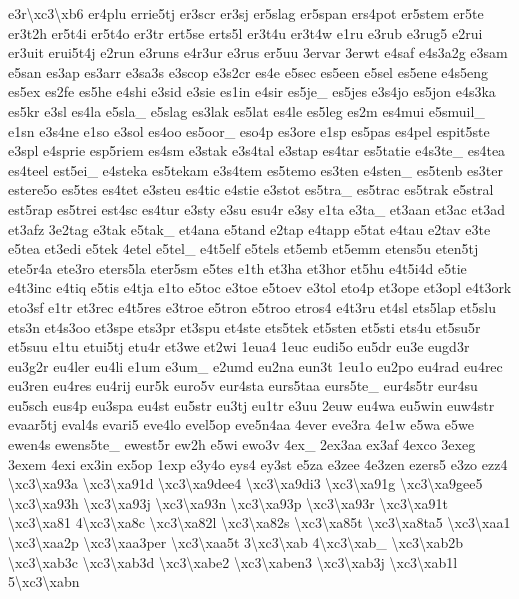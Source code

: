 {e3r\textbackslash{}xc3\textbackslash{}xb6 er4plu errie5tj er3scr er3sj er5slag er5span ers4pot er5stem er5te er3t2h er5t4i er5t4o er3tr ert5se erts5l er3t4u er3t4w e1ru e3rub e3rug5 e2rui er3uit erui5t4j e2run e3runs e4r3ur e3rus er5uu 3ervar 3erwt e4saf e4s3a2g e3sam e5san es3ap es3arr e3sa3s e3scop e3s2cr es4e e5sec es5een e5sel es5ene e4s5eng es5ex es2fe es5he e4shi e3sid e3sie es1in e4sir es5je\-\_\- es5jes e3s4jo es5jon e4s3ka es5kr e3sl es4la e5sla\-\_\- e5slag es3lak es5lat es4le es5leg es2m es4mui e5smuil\-\_\- e1sn e3s4ne e1so e3sol es4oo es5oor\-\_\- eso4p es3ore e1sp es5pas es4pel espit5ste e3spl e4sprie esp5riem es4sm e3stak e3s4tal e3stap es4tar es5tatie e4s3te\-\_\- es4tea es4teel est5ei\-\_\- e4steka es5tekam e3s4tem es5temo es3ten e4sten\-\_\- es5tenb es3ter estere5o es5tes es4tet e3steu es4tic e4stie e3stot es5tra\-\_\- es5trac es5trak e5stral est5rap es5trei est4sc es4tur e3sty e3su esu4r e3sy e1ta e3ta\-\_\- et3aan et3ac et3ad et3afz 3e2tag e3tak e5tak\-\_\- et4ana e5tand e2tap e4tapp e5tat e4tau e2tav e3te e5tea et3edi e5tek 4etel e5tel\-\_\- e4t5elf e5tels et5emb et5emm etens5u eten5tj ete5r4a ete3ro eters5la eter5sm e5tes e1th et3ha et3hor et5hu e4t5i4d e5tie e4t3inc e4tiq e5tis e4tja e1to e5toc e3toe e5toev e3tol eto4p et3ope et3opl e4t3ork eto3sf e1tr et3rec e4t5res e3troe e5tron e5troo etros4 e4t3ru et4sl ets5lap et5slu ets3n et4s3oo et3spe ets3pr et3spu et4ste ets5tek et5sten et5sti ets4u et5su5r et5suu e1tu etui5tj etu4r et3we et2wi 1eua4 1euc eudi5o eu5dr eu3e eugd3r eu3g2r eu4ler eu4li e1um e3um\-\_\- e2umd eu2na eun3t 1eu1o eu2po eu4rad eu4rec eu3ren eu4res eu4rij eur5k euro5v eur4sta eurs5taa eurs5te\-\_\- eur4s5tr eur4su eu5sch eus4p eu3spa eu4st eu5str eu3tj eu1tr e3uu 2euw eu4wa eu5win euw4str evaar5tj eval4s evari5 eve4lo evel5op eve5n4aa 4ever eve3ra 4e1w e5wa e5we ewen4s ewens5te\-\_\- ewest5r ew2h e5wi ewo3v 4ex\-\_\- 2ex3aa ex3af 4exco 3exeg 3exem 4exi ex3in ex5op 1exp e3y4o eys4 ey3st e5za e3zee 4e3zen ezers5 e3zo ezz4 \textbackslash{}xc3\textbackslash{}xa93a \textbackslash{}xc3\textbackslash{}xa91d \textbackslash{}xc3\textbackslash{}xa9dee4 \textbackslash{}xc3\textbackslash{}xa9di3 \textbackslash{}xc3\textbackslash{}xa91g \textbackslash{}xc3\textbackslash{}xa9gee5 \textbackslash{}xc3\textbackslash{}xa93h \textbackslash{}xc3\textbackslash{}xa93j \textbackslash{}xc3\textbackslash{}xa93n \textbackslash{}xc3\textbackslash{}xa93p \textbackslash{}xc3\textbackslash{}xa93r \textbackslash{}xc3\textbackslash{}xa91t \textbackslash{}xc3\textbackslash{}xa81 4\textbackslash{}xc3\textbackslash{}xa8c \textbackslash{}xc3\textbackslash{}xa82l \textbackslash{}xc3\textbackslash{}xa82s \textbackslash{}xc3\textbackslash{}xa85t \textbackslash{}xc3\textbackslash{}xa8ta5 \textbackslash{}xc3\textbackslash{}xaa1 \textbackslash{}xc3\textbackslash{}xaa2p \textbackslash{}xc3\textbackslash{}xaa3per \textbackslash{}xc3\textbackslash{}xaa5t 3\textbackslash{}xc3\textbackslash{}xab 4\textbackslash{}xc3\textbackslash{}xab\-\_\- \textbackslash{}xc3\textbackslash{}xab2b \textbackslash{}xc3\textbackslash{}xab3c \textbackslash{}xc3\textbackslash{}xab3d \textbackslash{}xc3\textbackslash{}xabe2 \textbackslash{}xc3\textbackslash{}xaben3 \textbackslash{}xc3\textbackslash{}xab3j \textbackslash{}xc3\textbackslash{}xab1l 5\textbackslash{}xc3\textbackslash{}xabn }
